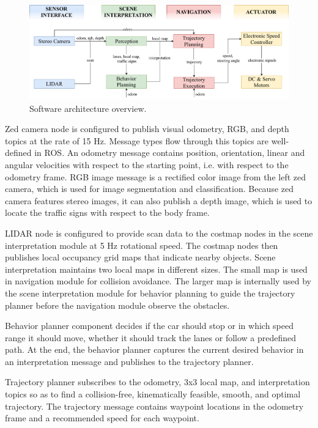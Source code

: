 \begin{figure}[h]
  \centering
  \includegraphics[width=.9\textwidth]{figures/software-architecture.pdf}
  \caption{Software architecture overview.}
  \label{figure:software-architecture}
\end{figure}

Zed camera node is configured to publish visual odometry, RGB, and depth topics
at the rate of 15 Hz. Message types flow through this topics are well-defined
in ROS. An odometry message contains position, orientation, linear and angular
velocities with respect to the starting point, i.e. with respect to the
odometry frame. RGB image message is a rectified color image from the left zed
camera, which is used for image segmentation and classification. Because zed
camera features stereo images, it can also publish a depth image, which is used
to locate the traffic signs with respect to the body frame.

LIDAR node is configured to provide scan data to the costmap nodes in the scene
interpretation module at 5 Hz rotational speed. The costmap nodes then
publishes local occupancy grid maps that indicate nearby objects. Scene
interpretation maintains two local maps in different sizes. The small map is
used in navigation module for collision avoidance.  The larger map is
internally used by the scene interpretation module for behavior planning to
guide the trajectory planner before the navigation module observe the
obstacles.

Behavior planner component decides if the car should stop or in which speed
range it should move, whether it should track the lanes or follow a predefined
path. At the end, the behavior planner captures the current desired
behavior in an interpretation message and publishes to the trajectory planner.

Trajectory planner subscribes to the odometry, 3x3 local map, and
interpretation topics so as to find a collision-free, kinematically feasible,
smooth, and optimal trajectory. The trajectory message contains waypoint
locations in the odometry frame and a recommended speed for each waypoint.

